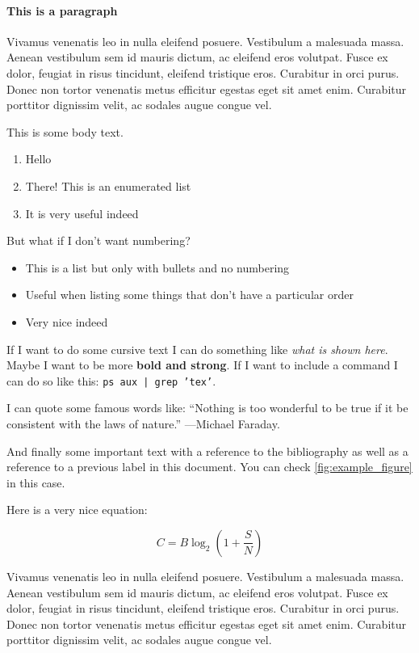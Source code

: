 	\paragraph{This is a paragraph} \label{sec:fourth_thing}

	Vivamus venenatis leo in nulla eleifend posuere. Vestibulum a malesuada massa. Aenean vestibulum sem id mauris dictum, ac eleifend eros volutpat. Fusce ex dolor, feugiat in risus tincidunt, eleifend tristique eros. Curabitur in orci purus. Donec non tortor venenatis metus efficitur egestas eget sit amet enim. Curabitur porttitor dignissim velit, ac sodales augue congue vel.

	This is some body text.

	\begin{enumerate}
		\item Hello
		\item There! This is an enumerated list
		\item It is very useful indeed
	\end{enumerate}

	But what if I don't want numbering?

	\begin{itemize}
		\item This is a list but only with bullets and no numbering
		\item Useful when listing some things that don't have a particular order
		\item Very nice indeed
	\end{itemize}

	If I want to do some cursive text I can do something like \textit{what is shown here}. Maybe I want to be more \textbf{bold and strong}. If I want to include a command I can do so like this: \texttt{ps aux | grep 'tex'}.

	I can quote some famous words like: ``Nothing is too wonderful to be true if it be consistent with the laws of nature.'' ---Michael Faraday.

	And finally some important text with a reference to the bibliography \cite{Antolinos2020} as well as a reference to a previous label in this document. You can check \cref{fig:example_figure} in this case.

	Here is a very nice equation:

\begin{equation}
	C=B\log _{2}\left(1+{\frac {S}{N}}\right)
\end{equation}

	Vivamus venenatis leo in nulla eleifend posuere. Vestibulum a malesuada massa. Aenean vestibulum sem id mauris dictum, ac eleifend eros volutpat. Fusce ex dolor, feugiat in risus tincidunt, eleifend tristique eros. Curabitur in orci purus. Donec non tortor venenatis metus efficitur egestas eget sit amet enim. Curabitur porttitor dignissim velit, ac sodales augue congue vel.

